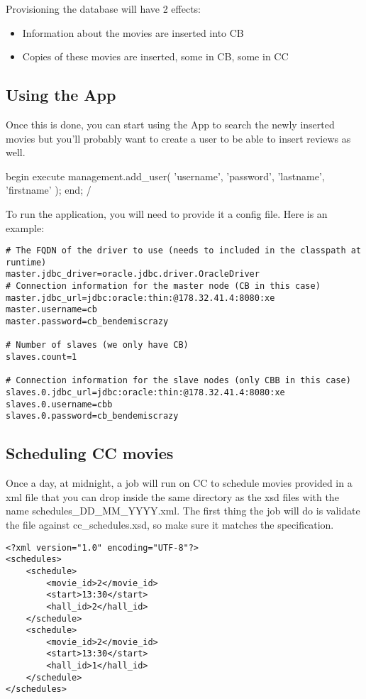 \documentclass[a4paper]{article}
\begin{document}
Provisioning the database will have 2 effects:
\begin{itemize}
	\item Information about the movies are inserted into CB
	\item Copies of these movies are inserted, some in CB, some in CC
\end{itemize}

\subsection{Using the App}

Once this is done, you can start using the App to search the newly inserted movies but you'll probably want to create a user to be able to insert reviews as well.

\begin{sqlcode}
begin
    execute management.add_user(
        'username',
        'password',
        'lastname',
        'firstname'
    );
end;
/
\end{sqlcode}

To run the application, you will need to provide it a config file. Here is an example:
\begin{verbatim}
# The FQDN of the driver to use (needs to included in the classpath at runtime)
master.jdbc_driver=oracle.jdbc.driver.OracleDriver
# Connection information for the master node (CB in this case)
master.jdbc_url=jdbc:oracle:thin:@178.32.41.4:8080:xe
master.username=cb
master.password=cb_bendemiscrazy

# Number of slaves (we only have CB)
slaves.count=1

# Connection information for the slave nodes (only CBB in this case)
slaves.0.jdbc_url=jdbc:oracle:thin:@178.32.41.4:8080:xe
slaves.0.username=cbb
slaves.0.password=cb_bendemiscrazy
\end{verbatim}

\subsection{Scheduling CC movies}

Once a day, at midnight, a job will run on CC to schedule movies provided in a xml file that you can drop inside the same directory as the xsd files with the name schedules\_DD\_MM\_YYYY.xml. The first thing the job will do is validate the file against cc\_schedules.xsd, so make sure it matches the specification.

\begin{verbatim}
<?xml version="1.0" encoding="UTF-8"?>
<schedules>
    <schedule>
        <movie_id>2</movie_id>
        <start>13:30</start>
        <hall_id>2</hall_id>
    </schedule>
    <schedule>
        <movie_id>2</movie_id>
        <start>13:30</start>
        <hall_id>1</hall_id>
    </schedule>
</schedules>
\end{verbatim}
\end{document}
